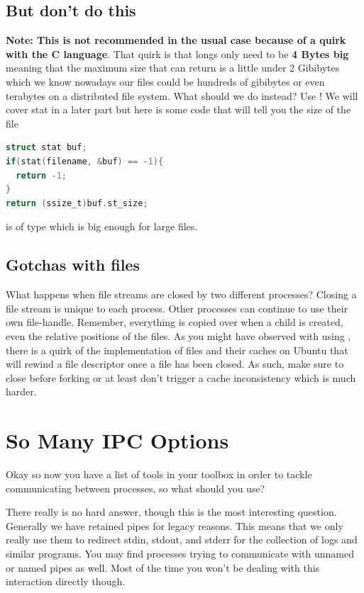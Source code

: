 \subsection{But don't do this}

\textbf{Note: This is not recommended in the usual case because of a quirk with the C language}.
That quirk is that longs only need to be \textbf{4 Bytes big} meaning that the maximum size that  can return is a little under 2 Gibibytes which we know nowadays our files could be hundreds of gibibytes or even terabytes on a distributed file system.
What should we do instead? Use ! We will cover stat in a later part but here is some code that will tell you the size of the file

\begin{lstlisting}[language=C]
struct stat buf;
if(stat(filename, &buf) == -1){
  return -1;
}
return (ssize_t)buf.st_size;
\end{lstlisting}

 is of type  which is big enough for large files.

\subsection{Gotchas with files}

What happens when file streams are closed by two different processes?
Closing a file stream is unique to each process.
Other processes can continue to use their own file-handle.
Remember, everything is copied over when a child is created, even the relative positions of the files.
As you might have observed with using , there is a quirk of the implementation of files and their caches on Ubuntu that will rewind a file descriptor once a file has been closed.
As such, make sure to close before forking or at least don't trigger a cache inconsistency which is much harder.

\section{So Many IPC Options}

Okay so now you have a list of tools in your toolbox in order to tackle communicating between processes, so what should you use?

There really is no hard answer, though this is the most interesting question.
Generally we have retained pipes for legacy reasons.
This means that we only really use them to redirect stdin, stdout, and stderr for the collection of logs and similar programs.
You may find processes trying to communicate with unnamed or named pipes as well.
Most of the time you won't be dealing with this interaction directly though.

